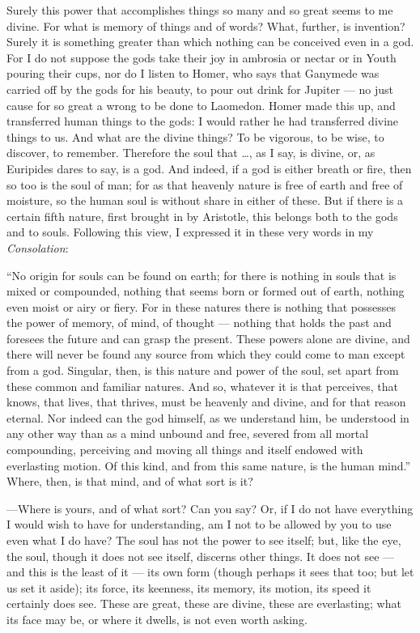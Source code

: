  Surely this power that accomplishes things so many and so great seems to me divine. For what is memory of things and of words? What, further, is invention? Surely it is something greater than which nothing can be conceived even in a god. For I do not suppose the gods take their joy in ambrosia or nectar or in Youth pouring their cups, nor do I listen to Homer, who says that Ganymede was carried off by the gods for his beauty, to pour out drink for Jupiter — no just cause for so great a wrong to be done to Laomedon. Homer made this up, and transferred human things to the gods: I would rather he had transferred divine things to us. And what are the divine things? To be vigorous, to be wise, to discover, to remember. Therefore the soul that …, as I say, is divine, or, as Euripides dares to say, is a god. And indeed, if a god is either breath or fire, then so too is the soul of man; for as that heavenly nature is free of earth and free of moisture, so the human soul is without share in either of these. But if there is a certain fifth nature, first brought in by Aristotle, this belongs both to the gods and to souls. Following this view, I expressed it in these very words in my \textit{Consolation}:

 ``No origin for souls can be found on earth; for there is nothing in souls that is mixed or compounded, nothing that seems born or formed out of earth, nothing even moist or airy or fiery. For in these natures there is nothing that possesses the power of memory, of mind, of thought — nothing that holds the past and foresees the future and can grasp the present. These powers alone are divine, and there will never be found any source from which they could come to man except from a god. Singular, then, is this nature and power of the soul, set apart from these common and familiar natures. And so, whatever it is that perceives, that knows, that lives, that thrives, must be heavenly and divine, and for that reason eternal. Nor indeed can the god himself, as we understand him, be understood in any other way than as a mind unbound and free, severed from all mortal compounding, perceiving and moving all things and itself endowed with everlasting motion. Of this kind, and from this same nature, is the human mind.'' Where, then, is that mind, and of what sort is it?

 —Where is yours, and of what sort? Can you say? Or, if I do not have everything I would wish to have for understanding, am I not to be allowed by you to use even what I do have? The soul has not the power to see itself; but, like the eye, the soul, though it does not see itself, discerns other things. It does not see — and this is the least of it — its own form (though perhaps it sees that too; but let us set it aside); its force, its keenness, its memory, its motion, its speed it certainly does see. These are great, these are divine, these are everlasting; what its face may be, or where it dwells, is not even worth asking.

